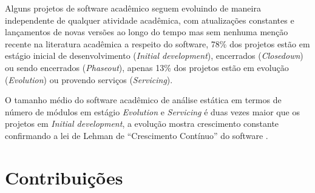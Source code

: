 Alguns projetos de software acadêmico seguem evoluindo de maneira independente
de qualquer atividade acadêmica, com atualizações constantes e lançamentos de
novas versões ao longo do tempo mas sem nenhuma menção recente na literatura
acadêmica a respeito do software, 78\% dos projetos estão em estágio inicial de
desenvolvimento ({\it Initial development}), encerrados ({\it Closedown}) ou
sendo encerrados ({\it Phaseout}), apenas 13\% dos projetos estão em evolução
({\it Evolution}) ou provendo serviços ({\it Servicing}).

O tamanho médio do software acadêmico de análise estática em termos de número
de módulos em estágio {\it Evolution} e {\it Servicing} é duas vezes maior que
os projetos em {\it Initial development}, a evolução mostra crescimento
constante confirmando a lei de Lehman de ``Crescimento Contínuo'' do software
\cite{lehman1997metrics}.








\section{Contribuições}

